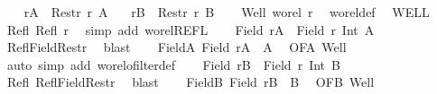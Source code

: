 \begin{isabellebody}
%
\isadelimproof
%
\endisadelimproof
%
\isatagproof
{}\isamarkupfalse%
{\isacharminus}{\kern0pt}\isanewline
\ \ \isamarkupfalse%
\ {\isacharquery}{\kern0pt}rA\ {\isacharequal}{\kern0pt}\ {\isachardoublequoteopen}Restr\ r\ A{\isachardoublequoteclose}\ \ \isamarkupfalse%
\ {\isacharquery}{\kern0pt}rB\ {\isacharequal}{\kern0pt}\ {\isachardoublequoteopen}Restr\ r\ B{\isachardoublequoteclose}\isanewline
\ \ \isamarkupfalse%
\ Well{\isacharcolon}{\kern0pt}\ {\isachardoublequoteopen}wo{\isacharunderscore}{\kern0pt}rel\ r{\isachardoublequoteclose}\ \isamarkupfalse%
\ wo{\isacharunderscore}{\kern0pt}rel{\isacharunderscore}{\kern0pt}def\ \isamarkupfalse%
\ WELL\ \isacommand{{\isachardot}{\kern0pt}}\isamarkupfalse%
\isanewline
\ \ \isamarkupfalse%
\ Refl{\isacharcolon}{\kern0pt}\ {\isachardoublequoteopen}Refl\ r{\isachardoublequoteclose}\ \isamarkupfalse%
\ {\isacharparenleft}{\kern0pt}simp\ add{\isacharcolon}{\kern0pt}\ wo{\isacharunderscore}{\kern0pt}rel{\isachardot}{\kern0pt}REFL{\isacharparenright}{\kern0pt}\isanewline
\ \ \isamarkupfalse%
\ {\isachardoublequoteopen}Field\ {\isacharquery}{\kern0pt}rA\ {\isacharequal}{\kern0pt}\ Field\ r\ Int\ A{\isachardoublequoteclose}\isanewline
\ \ \isamarkupfalse%
\ Refl{\isacharunderscore}{\kern0pt}Field{\isacharunderscore}{\kern0pt}Restr\ \isamarkupfalse%
\ blast\isanewline
\ \ \isamarkupfalse%
\ FieldA{\isacharcolon}{\kern0pt}\ {\isachardoublequoteopen}Field\ {\isacharquery}{\kern0pt}rA\ {\isacharequal}{\kern0pt}\ A{\isachardoublequoteclose}\ \isamarkupfalse%
\ OFA\ Well\isanewline
\ \ \isamarkupfalse%
\ {\isacharparenleft}{\kern0pt}auto\ simp\ add{\isacharcolon}{\kern0pt}\ wo{\isacharunderscore}{\kern0pt}rel{\isachardot}{\kern0pt}ofilter{\isacharunderscore}{\kern0pt}def{\isacharparenright}{\kern0pt}\isanewline
\ \ \isamarkupfalse%
\ {\isachardoublequoteopen}Field\ {\isacharquery}{\kern0pt}rB\ {\isacharequal}{\kern0pt}\ Field\ r\ Int\ B{\isachardoublequoteclose}\isanewline
\ \ \isamarkupfalse%
\ Refl\ Refl{\isacharunderscore}{\kern0pt}Field{\isacharunderscore}{\kern0pt}Restr\ \isamarkupfalse%
\ blast\isanewline
\ \ \isamarkupfalse%
\ FieldB{\isacharcolon}{\kern0pt}\ {\isachardoublequoteopen}Field\ {\isacharquery}{\kern0pt}rB\ {\isacharequal}{\kern0pt}\ B{\isachardoublequoteclose}\ \isamarkupfalse%
\ OFB\ Well\isanewline

\end{isabellebody}
